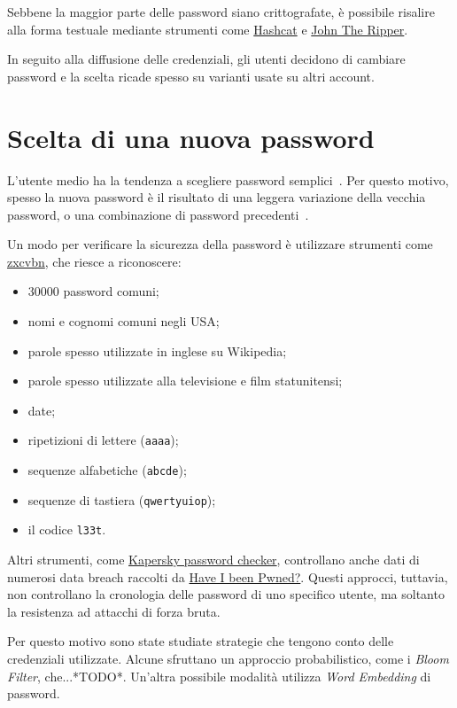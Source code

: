 Sebbene la maggior parte delle password siano crittografate, è possibile risalire alla forma testuale mediante strumenti come \href{https://github.com/hashcat/hashcat}{Hashcat} e \href{https://github.com/openwall/john}{John The Ripper}.

In seguito alla diffusione delle credenziali, gli utenti decidono di cambiare password e la scelta ricade spesso su varianti usate su altri account.
\section{Scelta di una nuova password}

L'utente medio ha la tendenza a scegliere password semplici~\cite{obspasshab}. Per questo motivo, spesso la nuova password è il risultato di una leggera variazione della vecchia password, o una combinazione di password precedenti~\cite{hypr}.

Un modo per verificare la sicurezza della password è utilizzare strumenti come \href{https://github.com/dropbox/zxcvbn}{zxcvbn}, che riesce a riconoscere:
\begin{itemize}
    \item 30000 password comuni;
    \item nomi e cognomi comuni negli USA;
    \item parole spesso utilizzate in inglese su Wikipedia;
    \item parole spesso utilizzate alla televisione e film statunitensi;
    \item date;
    \item ripetizioni di lettere (\texttt{aaaa});
    \item sequenze alfabetiche (\texttt{abcde});
    \item sequenze di tastiera (\texttt{qwertyuiop});
    \item il codice \texttt{l33t}.    
\end{itemize}

Altri strumenti, come \href{https://password.kaspersky.com/it/}{Kapersky password checker}, controllano anche dati di numerosi data breach raccolti da \href{https://haveibeenpwned.com/}{Have I been Pwned?}.
Questi approcci, tuttavia, non controllano la cronologia delle password di uno specifico utente, ma soltanto la resistenza ad attacchi di forza bruta.

Per questo motivo sono state studiate strategie che tengono conto delle credenziali utilizzate.
Alcune sfruttano un approccio probabilistico, come i \emph{Bloom Filter}, che...*TODO*. Un'altra possibile modalità utilizza \emph{Word Embedding} di password.

